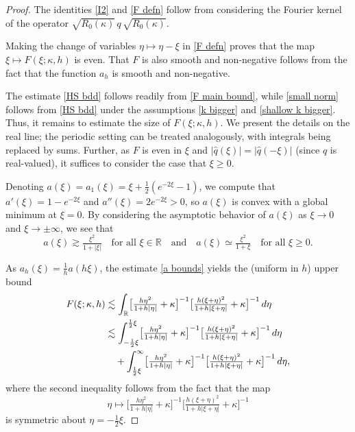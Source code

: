 \documentclass[10pt,a4paper]{amsart}
\newcommand{\R}{{\mathbb{R}}}
\begin{document}
\begin{proof}
The identities \eqref{I2} and \eqref{F defn} follow from considering the Fourier kernel of the operator \(\sqrt{R_0(\kappa)}\, q\, \sqrt{R_0(\kappa)}\).

Making the change of variables \(\eta\mapsto \eta-\xi\) in \eqref{F defn} proves that the map \(\xi\mapsto F(\xi;\kappa,h)\) is even.  That $F$ is also smooth and non-negative follows from the fact that the function $a_h$ is smooth and non-negative.

The estimate \eqref{HS bdd} follows readily from \eqref{F main bound}, while \eqref{small norm} follows from \eqref{HS bdd} under the assumptions \eqref{k bigger} and \eqref{shallow k bigger}.  Thus, it remains to estimate the size of $F(\xi;\kappa,h)$.  We present the details on the real line; the periodic setting can be treated analogously, with integrals being replaced by sums.  Further, as \(F\) is even in \(\xi\) and $|\widehat q(\xi)| = |\widehat q(-\xi)|$ (since $q$ is real-valued), it suffices to consider the case that \(\xi\geq0\). 

Denoting \(a(\xi) = a_1(\xi) = \xi + \tfrac12(e^{-2\xi}-1)\), we compute that \(a'(\xi) = 1 - e^{-2\xi}\) and \(a''(\xi) = 2e^{-2\xi}>0\), so \(a(\xi)\) is convex with a global minimum at \(\xi = 0\). By considering the asymptotic behavior of \(a(\xi)\) as \(\xi\to0\) and \(\xi\to \pm\infty\), we see that
\begin{equation}\label{a bounds}
a(\xi)\gtrsim \tfrac{\xi^2}{1+|\xi|}\quad\text{for all \(\xi\in \R\)}\quad\text{and}\quad a(\xi)\simeq \tfrac{\xi^2}{1+\xi}\quad\text{for all \(\xi\geq0\).}
\end{equation}

As \(a_h(\xi) = \frac1ha(h\xi)\), the estimate \eqref{a bounds} yields the (uniform in \(h\)) upper bound
\begin{align}
F(\xi;\kappa,h) &\lesssim \int_\R \bigl[\tfrac{h\eta^2}{1+h|\eta|} +\kappa\bigr]^{-1}\bigl[\tfrac{h(\xi+\eta)^2}{1+h|\xi+\eta|} + \kappa\bigr]^{-1} \,d\eta\notag\\
&\lesssim \int_{-\frac12\xi}^{\frac12\xi} \bigl[\tfrac{h\eta^2}{1+h|\eta|} +\kappa\bigr]^{-1}\bigl[\tfrac{h(\xi+\eta)^2}{1+h|\xi+\eta|} + \kappa\bigr]^{-1} \,d\eta\label{F upper bound}\\
&\quad  + \int_{\frac12\xi}^\infty \bigl[\tfrac{h\eta^2}{1+h|\eta|} +\kappa\bigr]^{-1}\bigl[\tfrac{h(\xi+\eta)^2}{1+h|\xi+\eta|} + \kappa\bigr]^{-1} \,d\eta,\notag
\end{align}
where the second inequality follows from the fact that the map
\[
\eta\mapsto \bigl[\tfrac{h\eta^2}{1+h|\eta|} +\kappa\bigr]^{-1}\bigl[\tfrac{h(\xi+\eta)^2}{1+h|\xi+\eta|} + \kappa\bigr]^{-1}
\]
is symmetric about \(\eta = -\frac12\xi\).



\end{proof}
\end{document}
